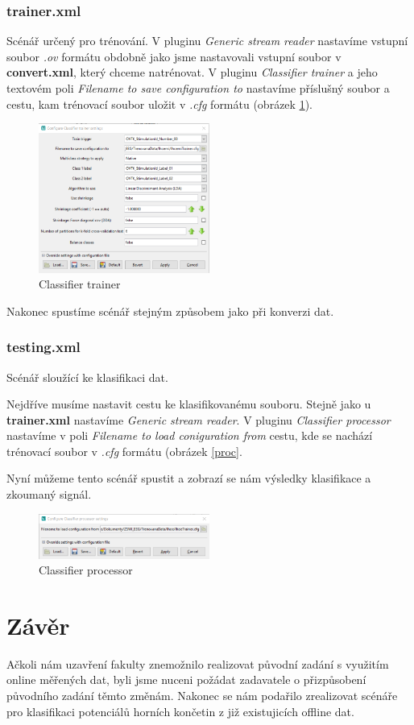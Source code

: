\documentclass{report}
\begin{document}
\subsection{trainer.xml}
Scénář určený pro trénování. V pluginu \textit{Generic stream reader} nastavíme vstupní soubor \textit{.ov} formátu obdobně jako jsme nastavovali vstupní soubor v \textbf{convert.xml}, který chceme natrénovat.
V pluginu \textit{Classifier trainer} a jeho textovém poli \textit{Filename to save configuration to} nastavíme příslušný soubor a cestu, kam trénovací soubor uložit v \textit{.cfg} formátu (obrázek \ref{fig:trainer}).

  \begin{figure}[!ht]
\centering
  \includegraphics[width=0.5\textwidth]{pictures/trainer.png}
  \caption{Classifier trainer}
  \label{fig:trainer}
 \end{figure}

Nakonec spustíme scénář stejným způsobem jako při konverzi dat.
\subsection{testing.xml}
Scénář sloužící ke klasifikaci dat.

Nejdříve musíme nastavit cestu ke klasifikovanému souboru. Stejně jako u \textbf{trainer.xml} nastavíme \textit{Generic stream reader}.
V pluginu \textit{Classifier processor} nastavíme v poli \textit{Filename to load coniguration from} cestu, kde se nachází trénovací soubor v \textit{.cfg} formátu (obrázek \ref{proc}.

Nyní můžeme tento scénář spustit a zobrazí se nám výsledky klasifikace a zkoumaný signál.

  \begin{figure}[!ht]
\centering
  \includegraphics[width=0.5\textwidth]{pictures/processorclass.png}
  \caption{Classifier processor}
  \label{fig:btns}
 \end{figure}


\chapter{Závěr}
Ačkoli nám uzavření fakulty znemožnilo realizovat původní zadání s využitím online měřených dat, byli jsme nuceni požádat zadavatele o přizpůsobení původního zadání těmto změnám. Nakonec se nám podařilo zrealizovat scénáře pro klasifikaci potenciálů horních končetin z již existujicích offline dat.
\end{document}
